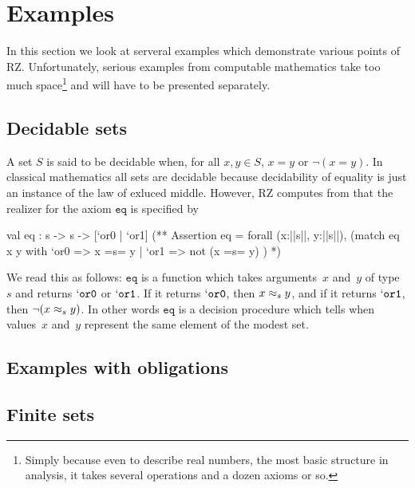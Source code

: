 \section{Examples}
\label{sec:examples}

In this section we look at serveral examples which demonstrate various
points of RZ. Unfortunately, serious examples from computable
mathematics take too much space\footnote{Simply because even to
  describe real numbers, the most basic structure in analysis, it
  takes several operations and a dozen axioms or so.} and will have to
be presented separately.

\subsection{Decidable sets}
\label{sec:decidable-sets}

A set $S$ is said to be decidable when, for all $x, y \in S$, $x = y$
or $\lnot (x = y)$. In classical mathematics all sets are decidable
because decidability of equality is just an instance of the law of
exluced middle. However, RZ computes from
%
%
that the realizer for the axiom $\mathtt{eq}$ is specified by
%
\begin{source}
val eq : s -> s -> [`or0 | `or1]
(**  Assertion eq =
       forall (x:||s||, y:||s||),
         (match eq x y with
            `or0 => x =s= y
          | `or1 => not (x =s= y)
          )
*)
\end{source}
%
We read this as follows: $\mathtt{eq}$ is a function which takes
arguments~$x$ and~$y$ of type~$s$ and returns $\mathtt{`or0}$ or
$\mathtt{`or1}$. If it returns $\mathtt{`or0}$, then $x \approx_s y$, and
if it returns $\mathtt{`or1}$, then $\lnot (x \approx_s y)$. In other
words $\mathtt{eq}$ is a decision procedure which tells when
values~$x$ and~$y$ represent the same element of the modest set.

\subsection{Examples with obligations}
\label{sec:exampl-with-oblig}


\subsection{Finite sets}
\label{sec:finite-sets}

